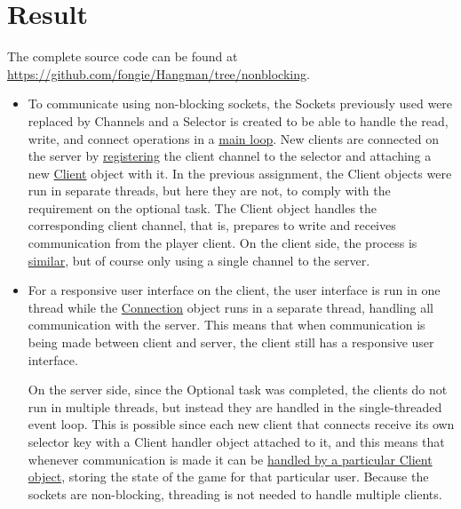 \documentclass[a4paper]{scrartcl}
\begin{document}
\section{Result}

\noindent The complete source code can be found at \href{https://github.com/fongie/Hangman/tree/nonblocking}{https://github.com/fongie/Hangman/tree/nonblocking}.

\begin{itemize}

	\item To communicate using non-blocking sockets, the Sockets previously used were replaced by Channels and a Selector is created to be able to handle the read, write, and connect operations in a \href{https://github.com/fongie/Hangman/blob/nonblocking/hangmanserver/src/main/java/net/Server.java#L49}{main loop}. New clients are connected on the server by \href{https://github.com/fongie/Hangman/blob/nonblocking/hangmanserver/src/main/java/net/Server.java#L85}{registering} the client channel to the selector and attaching a new \href{https://github.com/fongie/Hangman/blob/nonblocking/hangmanserver/src/main/java/net/Client.java}{Client} object with it. In the previous assignment, the Client objects were run in separate threads, but here they are not, to comply with the requirement on the optional task. The Client object handles the corresponding client channel, that is, prepares to write and receives communication from the player client. On the client side, the process is \href{https://github.com/fongie/Hangman/blob/nonblocking/hangmanclient/src/main/java/net/Connection.java#L84}{similar}, but of course only using a single channel to the server.
	
	\item For a responsive user interface on the client, the user interface is run in one thread while the \href{https://github.com/fongie/Hangman/blob/nonblocking/hangmanclient/src/main/java/net/Connection.java}{Connection} object runs in a separate thread, handling all communication with the server. This means that when communication is being made between client and server, the client still has a responsive user interface.
	
	On the server side, since the Optional task was completed, the clients do not run in multiple threads, but instead they are handled in the single-threaded event loop. This is possible since each new client that connects receive its own selector key with a Client handler object attached to it, and this means that whenever communication is made it can be \href{https://github.com/fongie/Hangman/blob/nonblocking/hangmanserver/src/main/java/net/Server.java#L62}{handled by a particular Client object}, storing the state of the game for that particular user. Because the sockets are non-blocking, threading is not needed to handle multiple clients.
	

\end{itemize}
\end{document}
